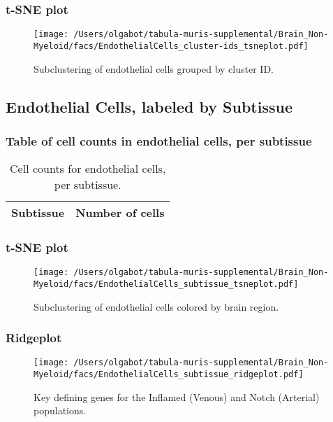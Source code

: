 \clearpage
\subsubsection{t-SNE plot}
\begin{figure}[h]
\centering
\texttt{[image: /Users/olgabot/tabula-muris-supplemental/Brain\_Non-Myeloid/facs/EndothelialCells\_cluster-ids\_tsneplot.pdf]}

\caption{Subclustering of endothelial cells grouped by cluster ID.
}
\end{figure}


\clearpage
\subsection{Endothelial Cells, labeled by Subtissue}
\subsubsection{Table of cell counts in endothelial cells, per subtissue}\begin{table}[h]
\centering
\label{my-label}
\begin{tabular}{@{}ll@{}}
\toprule

Subtissue& Number of cells \\ \midrule\bottomrule
\end{tabular}
\caption{Cell counts for endothelial cells, per subtissue.}
\end{table}

\clearpage
\subsubsection{t-SNE plot}
\begin{figure}[h]
\centering
\texttt{[image: /Users/olgabot/tabula-muris-supplemental/Brain\_Non-Myeloid/facs/EndothelialCells\_subtissue\_tsneplot.pdf]}

\caption{Subclustering of endothelial cells colored by brain region.
}
\end{figure}


\clearpage
\clearpage
\subsubsection{Ridgeplot}
\begin{figure}[h]
\centering
\texttt{[image: /Users/olgabot/tabula-muris-supplemental/Brain\_Non-Myeloid/facs/EndothelialCells\_subtissue\_ridgeplot.pdf]}

\caption{Key defining genes for the Inflamed (Venous) and Notch (Arterial) populations.
}
\end{figure}



